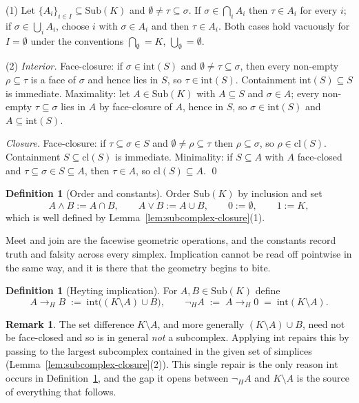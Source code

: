 \documentclass[final,12pt]{elsarticle}
\theoremstyle{plain}
\theoremstyle{definition}
\newtheorem{defi}[thm]{Definition}
\newtheorem{rem}[thm]{Remark}
\begin{document}
\proof
(1) Let \(\{A_i\}_{i \in I} \subseteq \mathrm{Sub}(K)\) and
\(\emptyset \neq \tau \subseteq \sigma\). If \(\sigma \in \bigcap_i A_i\) then
\(\tau \in A_i\) for every \(i\); if \(\sigma \in \bigcup_i A_i\), choose \(i\)
with \(\sigma \in A_i\) and then \(\tau \in A_i\). Both cases hold vacuously for
\(I = \emptyset\) under the conventions \(\bigcap_\emptyset = K\),
\(\bigcup_\emptyset = \emptyset\).

(2) \emph{Interior.} Face-closure: if \(\sigma \in \mathrm{int}(S)\) and
\(\emptyset \neq \tau \subseteq \sigma\), then every non-empty
\(\rho \subseteq \tau\) is a face of \(\sigma\) and hence lies in \(S\), so
\(\tau \in \mathrm{int}(S)\). Containment \(\mathrm{int}(S) \subseteq S\) is
immediate. Maximality: let \(A \in \mathrm{Sub}(K)\) with \(A \subseteq S\) and
\(\sigma \in A\); every non-empty \(\tau \subseteq \sigma\) lies in \(A\) by
face-closure of \(A\), hence in \(S\), so \(\sigma \in \mathrm{int}(S)\) and
\(A \subseteq \mathrm{int}(S)\).

\emph{Closure.} Face-closure: if \(\tau \subseteq \sigma \in S\) and
\(\emptyset \neq \rho \subseteq \tau\) then \(\rho \subseteq \sigma\), so
\(\rho \in \mathrm{cl}(S)\). Containment \(S \subseteq \mathrm{cl}(S)\) is
immediate. Minimality: if \(S \subseteq A\) with \(A\) face-closed and
\(\tau \subseteq \sigma \in S \subseteq A\), then \(\tau \in A\), so
\(\mathrm{cl}(S) \subseteq A\).
\qed

\begin{defi}[Order and constants]
\label{def:heyting-order}
Order \(\mathrm{Sub}(K)\) by inclusion and set
\[
A \wedge B := A \cap B, \qquad
A \vee B := A \cup B, \qquad
0 := \emptyset, \qquad
1 := K ,
\]
which is well defined by Lemma~\ref{lem:subcomplex-closure}(1).
\end{defi}

Meet and join are the facewise geometric operations, and the constants record
truth and falsity across every simplex. Implication cannot be read off pointwise
in the same way, and it is there that the geometry begins to bite.

\begin{defi}[Heyting implication]
\label{def:heyting-implication}
For \(A, B \in \mathrm{Sub}(K)\) define
\[
A \to_H B \;:=\; \mathrm{int}\bigl((K \setminus A) \cup B\bigr),
\qquad
\neg_H A \;:=\; A \to_H 0 \;=\; \mathrm{int}(K \setminus A).
\]
\end{defi}

\begin{rem}
\label{rem:why-interior}
The set difference \(K \setminus A\), and more generally
\((K \setminus A) \cup B\), need not be face-closed and so is in general
\emph{not} a subcomplex. Applying \(\mathrm{int}\) repairs this by passing to the
largest subcomplex contained in the given set of simplices
(Lemma~\ref{lem:subcomplex-closure}(2)). This single repair is the only reason
\(\mathrm{int}\) occurs in Definition~\ref{def:heyting-implication}, and the gap
it opens between \(\neg_H A\) and \(K \setminus A\) is the source of everything
that follows.
\end{rem}
\end{document}
